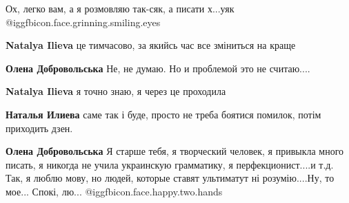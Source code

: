 Ох, легко вам, а я розмовляю так-сяк, а писати х...уяк @igg{fbicon.face.grinning.smiling.eyes} 

\begin{itemize}
 
\textbf{Natalya Ilieva} це тимчасово, за якийсь час все зміниться на краще

 
\textbf{Олена Добровольська} Не, не думаю. Но и проблемой это не считаю....

 
\textbf{Natalya Ilieva} я точно знаю, я через це проходила

 
\textbf{Наталья Илиева} саме так і буде, просто не треба боятися помилок, потім приходить дзен.

 
\textbf{Олена Добровольська} Я старше тебя, я творческий человек, я привыкла много писать, я никогда не учила украинскую грамматику, я перфекционист....и т.д. Так, я люблю мову, но людей, которые ставят ультиматут ні розумію....Ну, то мое... Спокі, лю...  
@igg{fbicon.face.happy.two.hands} 

\end{itemize}

